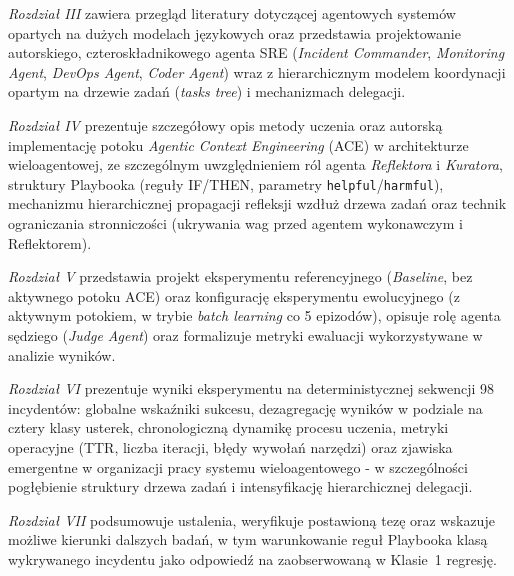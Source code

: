\textit{Rozdział III} zawiera przegląd literatury dotyczącej agentowych systemów opartych na dużych modelach językowych oraz przedstawia projektowanie autorskiego, czteroskładnikowego agenta SRE (\textit{Incident Commander}, \textit{Monitoring Agent}, \textit{DevOps Agent}, \textit{Coder Agent}) wraz z hierarchicznym modelem koordynacji opartym na drzewie zadań (\textit{tasks tree}) i mechanizmach delegacji.

\textit{Rozdział IV} prezentuje szczegółowy opis metody uczenia oraz autorską implementację potoku \textit{Agentic Context Engineering} (ACE) w architekturze wieloagentowej, ze szczególnym uwzględnieniem ról agenta \textit{Reflektora} i \textit{Kuratora}, struktury Playbooka (reguły IF/THEN, parametry \texttt{helpful}/\texttt{harmful}), mechanizmu hierarchicznej propagacji refleksji wzdłuż drzewa zadań oraz technik ograniczania stronniczości (ukrywania wag przed agentem wykonawczym i Reflektorem).

\textit{Rozdział V} przedstawia projekt eksperymentu referencyjnego (\textit{Baseline}, bez aktywnego potoku ACE) oraz konfigurację eksperymentu ewolucyjnego (z aktywnym potokiem, w trybie \textit{batch learning} co 5 epizodów), opisuje rolę agenta sędziego (\textit{Judge Agent}) oraz formalizuje metryki ewaluacji wykorzystywane w analizie wyników.

\textit{Rozdział VI} prezentuje wyniki eksperymentu na deterministycznej sekwencji 98 incydentów: globalne wskaźniki sukcesu, dezagregację wyników w podziale na cztery klasy usterek, chronologiczną dynamikę procesu uczenia, metryki operacyjne (TTR, liczba iteracji, błędy wywołań narzędzi) oraz zjawiska emergentne w organizacji pracy systemu wieloagentowego - w szczególności pogłębienie struktury drzewa zadań i intensyfikację hierarchicznej delegacji.

\textit{Rozdział VII} podsumowuje ustalenia, weryfikuje postawioną tezę oraz wskazuje możliwe kierunki dalszych badań, w tym warunkowanie reguł Playbooka klasą wykrywanego incydentu jako odpowiedź na zaobserwowaną w Klasie~1 regresję.
